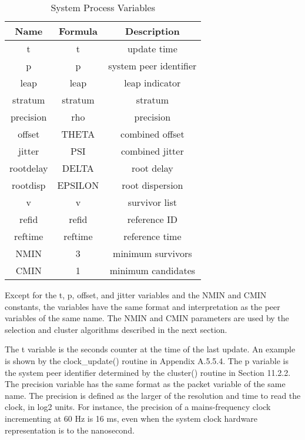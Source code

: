 \begin{table}[htb]
\center
\begin{tabular}{c | c | c}
Name & Formula & Description \\
\hline
\hline
t         & t          & update time            \\
p         & p          & system peer identifier \\
leap      & leap       & leap indicator         \\
stratum   & stratum    & stratum                \\
precision & rho        & precision              \\
offset    & THETA      & combined offset        \\
jitter    & PSI        & combined jitter        \\
rootdelay & DELTA      & root delay             \\
rootdisp  & EPSILON    & root dispersion        \\
v         & v          & survivor list          \\
refid     & refid      & reference ID           \\
reftime   & reftime    & reference time         \\
NMIN      & 3          & minimum survivors      \\
CMIN      & 1          & minimum candidates     \\
\hline
\end{tabular}
\label{system_process_variables}
\caption{System Process Variables}
\end{table}

Except for the t, p, offset, and jitter variables and the NMIN and
CMIN constants, the variables have the same format and interpretation
as the peer variables of the same name.  The NMIN and CMIN parameters
are used by the selection and cluster algorithms described in the
next section.

The t variable is the seconds counter at the time of the last update.
An example is shown by the clock\_update() routine in
Appendix A.5.5.4.  The p variable is the system peer identifier
determined by the cluster() routine in Section 11.2.2.  The precision
variable has the same format as the packet variable of the same name.
The precision is defined as the larger of the resolution and time to
read the clock, in log2 units.  For instance, the precision of a
mains-frequency clock incrementing at 60 Hz is 16 ms, even when the
system clock hardware representation is to the nanosecond.

